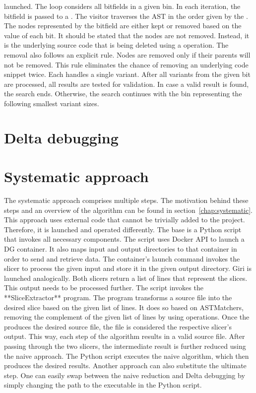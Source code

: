 launched.
The loop considers all bitfields in a given bin.
In each iteration, the bitfield is passed to 
a .
The visitor traverses the AST in the order given by 
the .
The nodes represented by the bitfield are either kept or removed based on 
the value of each bit.
It should be stated that the nodes are not removed.
Instead, it is the underlying source code that is being deleted using 
a  operation.
The removal also follows an explicit rule.
Nodes are removed only if their parents will not be removed.
This rule eliminates the chance of removing an underlying code snippet twice.
Each  handles a single variant.
After all variants from the given bit are processed, all results are tested 
for validation.
In case a valid result is found, the search ends.
Otherwise, the search continues with the bin representing the following 
smallest variant sizes.

\section{Delta debugging}

\section{Systematic approach}


The systematic approach comprises multiple steps.
The motivation behind these steps and an overview of the algorithm can be 
found in section~\ref{chap:systematic}.
This approach uses external code that cannot be trivially added to 
the project.
Therefore, it is launched and operated differently.
The base is a Python script that invokes all necessary components.
The script uses Docker API to launch a DG container.
It also maps input and output directories to that container in order to send 
and retrieve data.
The container's launch command invokes the slicer to process the given input 
and store it in the given output directory.
Giri is launched analogically.
Both slicers return a list of lines that represent the slices.
This output needs to be processed further.
The script invokes the **SliceExtractor** program.
The program transforms a source file into the desired slice based on 
the given list of lines.
It does so based on ASTMatchers, removing the complement of the given list 
of lines by using  operations.
Once the  produces the desired source file, the file 
is considered the respective slicer's output.
This way, each step of the algorithm results in a valid source file.
After passing through the two slicers, the intermediate result is further 
reduced using the naive approach.
The Python script executes the naive algorithm, which then produces the 
desired results.
Another approach can also substitute the ultimate step.
One can easily swap between the naive reduction and Delta debugging by 
simply changing the path to the executable in the Python script.
